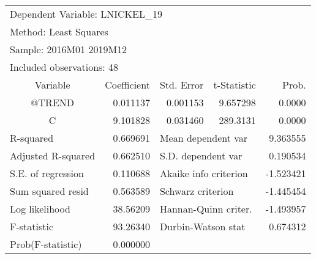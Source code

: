 \begin{tabular}{lrrrr}
\toprule
\multicolumn{3}{l}{Dependent Variable: LNICKEL\_19}&\multicolumn{1}{c}{}&\multicolumn{1}{c}{}\\
\multicolumn{2}{l}{Method: Least Squares}&\multicolumn{1}{c}{}&\multicolumn{1}{c}{}&\multicolumn{1}{c}{}\\
\multicolumn{2}{l}{Sample: 2016M01 2019M12}&\multicolumn{1}{c}{}&\multicolumn{1}{c}{}&\multicolumn{1}{c}{}\\
\multicolumn{2}{l}{Included observations: 48}&\multicolumn{1}{c}{}&\multicolumn{1}{c}{}&\multicolumn{1}{c}{}\\
\midrule
\multicolumn{1}{c}{Variable}&\multicolumn{1}{r}{Coefficient}&\multicolumn{1}{r}{Std. Error}&\multicolumn{1}{r}{t-Statistic}&\multicolumn{1}{r}{Prob.}\\
\midrule
\multicolumn{1}{c}{@TREND}&\multicolumn{1}{r}{0.011137}&\multicolumn{1}{r}{0.001153}&\multicolumn{1}{r}{9.657298}&\multicolumn{1}{r}{0.0000}\\
\multicolumn{1}{c}{C}&\multicolumn{1}{r}{9.101828}&\multicolumn{1}{r}{0.031460}&\multicolumn{1}{r}{289.3131}&\multicolumn{1}{r}{0.0000}\\
\midrule
\multicolumn{1}{l}{R-squared}&\multicolumn{1}{r}{0.669691}&\multicolumn{2}{l}{Mean dependent var}&\multicolumn{1}{r}{9.363555}\\
\multicolumn{1}{l}{Adjusted R-squared}&\multicolumn{1}{r}{0.662510}&\multicolumn{2}{l}{S.D. dependent var}&\multicolumn{1}{r}{0.190534}\\
\multicolumn{1}{l}{S.E. of regression}&\multicolumn{1}{r}{0.110688}&\multicolumn{2}{l}{Akaike info criterion}&\multicolumn{1}{r}{-1.523421}\\
\multicolumn{1}{l}{Sum squared resid}&\multicolumn{1}{r}{0.563589}&\multicolumn{2}{l}{Schwarz criterion}&\multicolumn{1}{r}{-1.445454}\\
\multicolumn{1}{l}{Log likelihood}&\multicolumn{1}{r}{38.56209}&\multicolumn{2}{l}{Hannan-Quinn criter.}&\multicolumn{1}{r}{-1.493957}\\
\multicolumn{1}{l}{F-statistic}&\multicolumn{1}{r}{93.26340}&\multicolumn{2}{l}{Durbin-Watson stat}&\multicolumn{1}{r}{0.674312}\\
\multicolumn{1}{l}{Prob(F-statistic)}&\multicolumn{1}{r}{0.000000}&\multicolumn{1}{c}{}&\multicolumn{1}{c}{}&\multicolumn{1}{c}{}\\
\bottomrule
\end{tabular}
